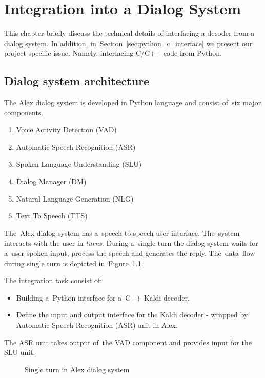 \chapter{Integration into a Dialog System}
\label{cha:integration}
This chapter briefly discuss the technical details of interfacing
a decoder from a dialog system.
In addition, in~Section~\ref{sec:python_c_interface} we present our project specific issue.
Namely, interfacing C/C++ code from Python.



\section{Dialog system architecture} 
\label{sec:dialog_system_architecture}
The Alex dialog system is developed in Python language and consist of~six major components. 
\begin{enumerate}
    \item Voice Activity Detection (VAD)
    \item Automatic Speech Recognition (ASR) 
    \item Spoken Language Understanding (SLU)
    \item Dialog Manager (DM)
    \item Natural Language Generation (NLG)
    \item Text To Speech (TTS)
\end{enumerate}
The~Alex dialog system has a~speech to speech user interface. The~system interacts with the user in {\it turns}. During a~single turn the dialog system waits for a~user spoken input, process the speech and generates the reply.
The~data~flow during single turn is depicted in~Figure~\ref{fig:dialog_system}.

The integration task consist of:
\begin{itemize}
    \item Building a~Python interface for a~C++ Kaldi decoder.
    \item Define the input and output interface for the Kaldi decoder - wrapped by Automatic Speech Recognition (ASR) unit in Alex.
\end{itemize}
 The ASR unit takes output of~the VAD component and provides input for the SLU unit. 

\begin{figure}
    \begin{center}
    
    \caption{Single turn in Alex dialog system}
    \label{fig:dialog_system} 
    \end{center}
\end{figure}

